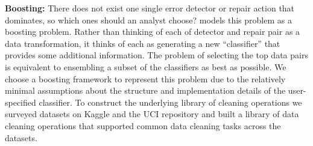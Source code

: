 \vspace{0.5em}\noindent\textbf{Boosting: } There does not exist one single error detector or repair action that dominates, so which ones should an analyst choose? 
\sys models this problem as a boosting problem.
Rather than thinking of each of detector and repair pair as a data transformation, it thinks of each as generating a new ``classifier'' that provides some additional information.
The problem of selecting the top data pairs is equivalent to ensembling a subset of the classifiers as best as possible.
We choose a boosting framework to represent this problem due to the relatively minimal assumptions about the structure and implementation details of the user-specified classifier.
To construct the underlying library of cleaning operations we surveyed datasets on Kaggle and the UCI repository and built a library of data cleaning operations that supported common data cleaning tasks across the datasets.


